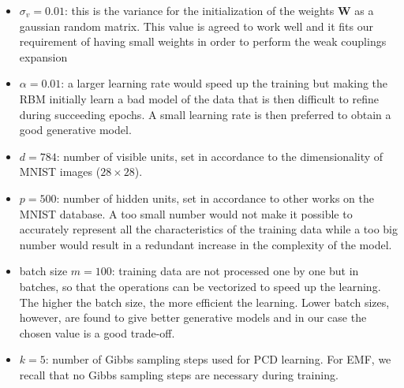 \documentclass[notitlepage]{revtex4-1}
\begin{document}
\begin{itemize}
  \item \(\sigma_v = 0.01\): this is the variance for the initialization of the weights \(\mathbf{W}\) as a gaussian random matrix. This value is agreed to work well and it fits our requirement of having small weights in order to perform the weak couplings expansion
  \item \(\alpha = 0.01\): a larger learning rate would speed up the training but making the RBM initially learn a bad model of the data that is then difficult to refine during succeeding epochs. A small learning rate is then preferred to obtain a good generative model.
  \item \(d = 784\): number of visible units, set in accordance to the dimensionality of MNIST images (\(28 \times 28\)).
  \item \(p = 500\): number of hidden units, set in accordance to other works on the MNIST database. A too small number would not make it possible to accurately represent all the characteristics of the training data while a too big number would result in a redundant increase in the complexity of the model.
  \item batch size \(m = 100\): training data are not processed one by one but in batches, so that the operations can be vectorized to speed up the learning. The higher the batch size, the more efficient the learning. Lower batch sizes, however, are found to give better generative models and in our case the chosen value is a good trade-off.
  \item \( k = 5 \): number of Gibbs sampling steps used for PCD learning. For EMF, we recall that no Gibbs sampling steps are necessary during training.
\end{itemize}
\end{document}
